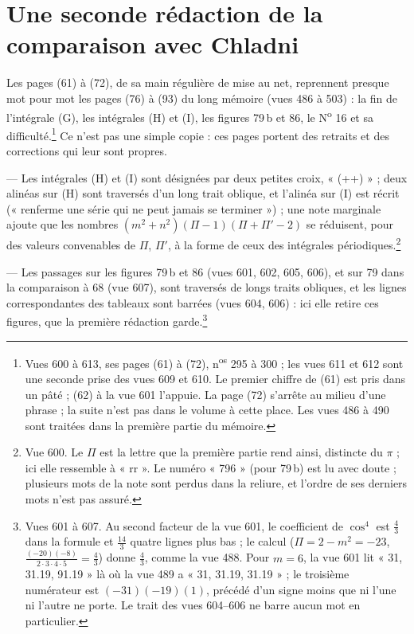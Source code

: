 \documentclass[11pt,a4paper]{article}
\begin{document}
\section*{Une seconde rédaction de la comparaison avec Chladni}

Les pages (61) à (72), de sa main régulière de mise au net, reprennent presque
mot pour mot les pages (76) à (93) du long mémoire (vues 486 à 503) : la fin de
l'intégrale (G), les intégrales (H) et (I), les figures 79\,b et 86, le
N\textsuperscript{o} 16 et sa difficulté.\footnote{Vues 600 à 613, ses pages (61)
à (72), n\textsuperscript{os} 295 à 300 ; les vues 611 et 612 sont une seconde
prise des vues 609 et 610. Le premier chiffre de (61) est pris dans un pâté ;
(62) à la vue 601 l'appuie. La page (72) s'arrête au milieu d'une phrase ; la
suite n'est pas dans le volume à cette place. Les vues 486 à 490 sont traitées
dans la première partie du mémoire.} Ce n'est pas une simple copie : ces pages
portent des retraits et des corrections qui leur sont propres.

— Les intégrales (H) et (I) sont désignées par deux petites croix,
« (++) » ; deux alinéas sur (H) sont traversés d'un long trait oblique, et
l'alinéa sur (I) est récrit (« renferme une série qui ne peut jamais se
terminer ») ; une note marginale ajoute que les nombres
$(m^2+n^2)(\Pi-1)(\Pi+\Pi'-2)$ se réduisent, pour des valeurs convenables de
$\Pi$, $\Pi'$, à la forme de ceux des intégrales périodiques.\footnote{Vue 600.
Le $\Pi$ est la lettre que la première partie rend ainsi, distincte du
$\pi$ ; ici elle ressemble à « rr ». Le numéro « 796 » (pour 79\,b) est lu avec
doute ; plusieurs mots de la note sont perdus dans la reliure, et l'ordre de ses
derniers mots n'est pas assuré.}

— Les passages sur les figures 79\,b et 86 (vues 601, 602, 605, 606), et sur 79
dans la comparaison à 68 (vue 607), sont traversés de longs traits obliques, et
les lignes correspondantes des tableaux sont barrées (vues 604, 606) : ici elle
retire ces figures, que la première rédaction garde.\footnote{Vues 601 à 607. Au
second facteur de la vue 601, le coefficient de $\cos^4$ est $\frac{4}{3}$ dans
la formule et $\frac{14}{3}$ quatre lignes plus bas ; le calcul
($\Pi = 2-m^2 = -23$, $\frac{(-20)(-8)}{2\cdot3\cdot4\cdot5} = \frac43$) donne
$\frac43$, comme la vue 488. Pour $m = 6$, la vue 601 lit « 31, 31.19, 91.19 »
là où la vue 489 a « 31, 31.19, 31.19 » ; le troisième numérateur est
$(-31)(-19)(1)$, précédé d'un signe moins que ni l'une ni l'autre ne porte. Le
trait des vues 604--606 ne barre aucun mot en particulier.}
\end{document}
